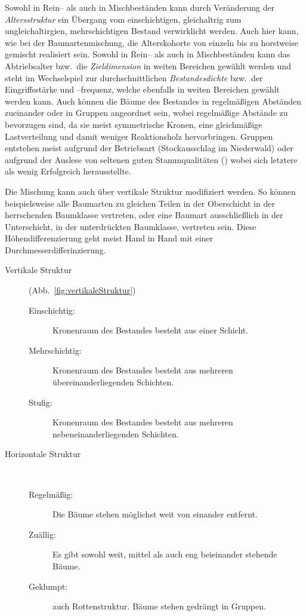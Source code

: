 \documentclass[twocolumn]{scrartcl}
\begin{document}
Sowohl in Rein-- als auch in Mischbeständen kann durch Veränderung der
\emph{Altersstruktur} ein Übergang vom einschichtigen, gleichaltrig
zum ungleichaltirgien, mehrschichtigen Bestand verwirklicht
werden. Auch hier kann, wie bei der Baumartenmischung, die
Alterskohorte von einzeln bis zu horstweise gemischt realisiert
sein. Sowohl in Rein-- als auch in Mischbeständen kann das
Abtriebsalter bzw.\ die \emph{Zieldimension} in weiten Bereichen
gewählt werden und steht im Wechselspiel zur durchschnittlichen
\emph{Bestandesdichte} bzw.\ der Eingriffsstärke und --frequenz,
welche ebenfalls in weiten Bereichen gewählt werden kann. Auch können
die Bäume des Bestandes in regelmäßigen Abständen zueinander oder in
Gruppen angeordnet sein, wobei regelmäßige Abstände zu bevorzugen sind,
da sie meist symmetrische Kronen, eine gleichmäßige Lastverteilung und
damit weniger Reaktionsholz hervorbringen. Gruppen entstehen meist
aufgrund der Betriebsart (Stockausschlag im Niederwald) oder aufgrund
der Auslese von seltenen guten Stammqualitäten
(\cite{kato1969Buchendurchforstung,kato1988Gruppendurchforstung})
wobei sich letztere als wenig Erfolgreich herausstellte.

Die Mischung kann auch über vertikale Struktur modifiziert werden. So
können beispielsweise alle Baumarten zu gleichen Teilen in der
Oberschicht in der herrschenden Baumklasse vertreten, oder eine Baumart
ausschließlich in der Unterschicht, in der unterdrückten Baumklasse,
vertreten sein. Diese Höhendifferenzierung geht meist Hand in Hand mit
einer Durchmesserdifferinzierung.

\begin{description}
\item[Vertikale Struktur] (Abb.~\ref{fig:vertikaleStruktur})
  \begin{description}
  \item[Einschichtig:] Kronenraum des Bestandes besteht aus einer Schicht.
  \item[Mehrschichtig:] Kronenraum des Bestandes besteht aus mehreren übereinanderliegenden Schichten.
  \item[Stufig:] Kronenraum des Bestandes besteht aus mehreren nebeneinanderliegenden Schichten.
  \end{description}
\item[Horizontale Struktur]~
  \begin{description}
  \item[Regelmäßig:] Die Bäume stehen möglichst weit von einander entfernt.
  \item[Zuällig:] Es gibt sowohl weit, mittel als auch eng beieinander stehende Bäume.
  \item[Geklumpt:] auch Rottenstruktur. Bäume stehen gedrängt in Gruppen.
  \end{description}
\end{description}
\end{document}
